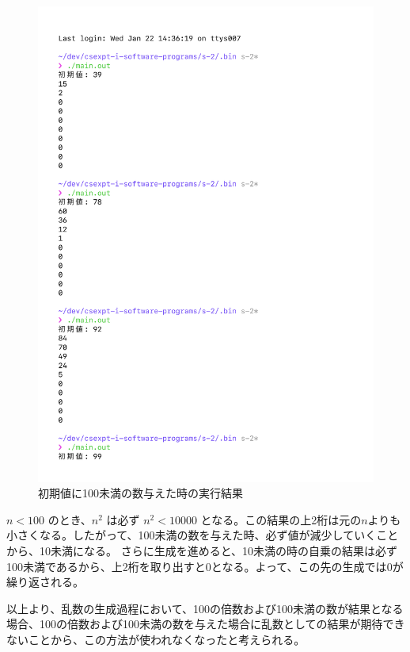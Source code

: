 \begin{figure}[H]
    \ContinuedFloat
    \centering
    \includegraphics[width=0.8\hsize, pagebox=mediabox, page=2]{main_result3.pdf}
    \caption{初期値に100未満の数与えた時の実行結果}
    \label{初期値に100未満の数与えた時の実行結果}
\end{figure}

$n < 100$ のとき、$n^2$ は必ず $n^2 < 10000$ となる。この結果の上2桁は元の$n$よりも小さくなる。したがって、100未満の数を与えた時、必ず値が減少していくことから、10未満になる。
さらに生成を進めると、10未満の時の自乗の結果は必ず100未満であるから、上2桁を取り出すと$0$となる。よって、この先の生成では$0$が繰り返される。

以上より、乱数の生成過程において、100の倍数および100未満の数が結果となる場合、100の倍数および100未満の数を与えた場合に乱数としての結果が期待できないことから、この方法が使われなくなったと考えられる。
